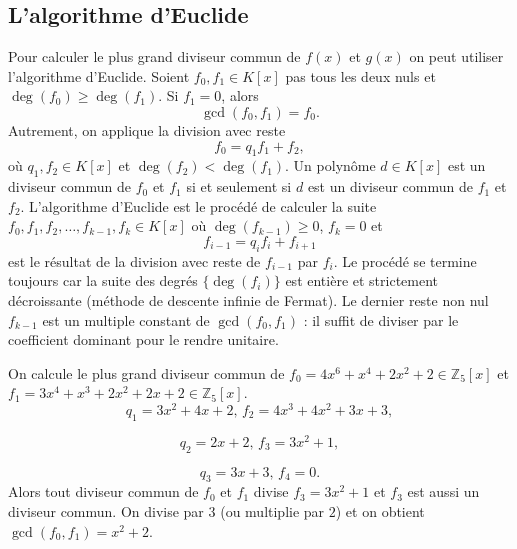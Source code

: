 \subsection{L'algorithme d'Euclide}
\label{sec:lalg-de-eucl}



Pour calculer le plus grand diviseur commun de $f(x)$ et $g(x)$  on peut utiliser l'algorithme d'Euclide. Soient $f_0,f_1 ∈K[x]$ pas tous les deux nuls et $\deg(f_0) ≥ \deg(f_1)$. Si $f_1 = 0$, alors
\begin{displaymath}
\gcd(f_0,f_1) =   f_0. 
\end{displaymath}
Autrement, on applique la division avec reste
\begin{displaymath}
  f_0 = q_1 f_1 + f_2, 
\end{displaymath}
où $q_1,f_2 ∈K[x]$ et $ \deg(f_2)< \deg(f_1)$. Un polynôme  $d ∈K[x]$ est un diviseur commun de $f_0$ et $f_1$ si et seulement si $d$ est un diviseur commun de $f_1$ et $f_2$. L'algorithme d'Euclide est le procédé de calculer la suite $f_0,f_1,f_2,\dots,f_{k-1},f_k ∈K[x]$  où $\deg(f_{k-1})≥0$, $f_k=0$ et 
\begin{displaymath}
  f_{i-1} = q_i f_i + f_{i+1} 
\end{displaymath}
est le résultat de la division avec reste de $f_{i-1} $ par $f_i$. Le procédé se termine toujours car la suite des degrés $\{\deg(f_i)\}$ est entière et strictement décroissante (méthode de descente infinie de Fermat). Le dernier reste non nul $f_{k-1}$ est un multiple constant de $\gcd(f_0,f_1)$ : il suffit de diviser par le coefficient dominant pour le rendre unitaire.


\begin{example}
  \label{exe:25-b}
  On calcule le plus grand diviseur commun de
$f_0 =  4 x^{6} + x^{4} + 2 x^{2} + 2 ∈ℤ_5[x]$  et 
$f_1 =  3 x^{4} + x^{3} + 2 x^{2} + 2 x + 2 ∈ℤ_5[x]$. 
  \begin{displaymath}
   q_1 =  3 x^{2} + 4 x + 2, \, 
   f_2 =  4 x^{3} + 4 x^{2} + 3 x + 3, 
 \end{displaymath}

 \begin{displaymath}
   q_2 =  2 x + 2, \, 
f_3 =  3 x^{2} + 1, 
\end{displaymath}

\begin{displaymath}
  q_3 =  3 x + 3, \, 
  f_4 =  0. 
\end{displaymath}
Alors tout diviseur commun de $f_0$ et $f_1$ divise $f_3 =  3 x^{2} + 1$ et $f_3$ est aussi un diviseur commun. On divise par $3$ (ou multiplie par $2$) et on obtient  $\gcd(f_0,f_1) = x^2 +2$. 

\end{example}

